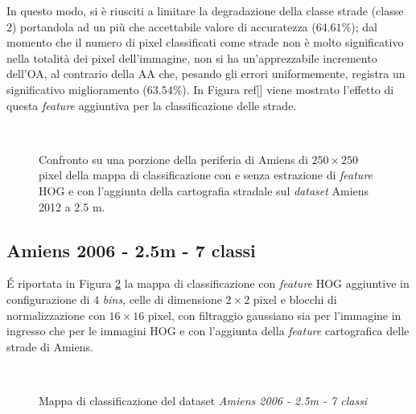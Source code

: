  In questo modo, si è riusciti a limitare la degradazione della classe strade (classe 2) portandola ad un più che accettabile valore di accuratezza ($64.61\%$); dal momento che il numero di pixel classificati come strade non è molto significativo nella totalità dei pixel dell'immagine, non si ha un'apprezzabile incremento dell'OA, al contrario della AA che, pesando gli errori uniformemente, registra un significativo miglioramento ($63.54\%$).
In Figura ref[] viene mostrato l'effetto di questa \emph{feature} aggiuntiva per la classificazione delle strade.
 \begin{figure}[!ht]
\center 
   \hspace{3mm}
      \\
    \caption{Confronto su una porzione della periferia di Amiens di $250\times250$ pixel della mappa di classificazione con e senza estrazione di \emph{feature} HOG e con l'aggiunta della cartografia stradale sul \emph{dataset} Amiens 2012 a $2.5$ m. }
    \label{fig:confrontoAmiens2012_2_5m}
  \end{figure}
  \clearpage
  

\subsection{Amiens 2006 - 2.5m - 7 classi}
\'E riportata in Figura \ref{fig:ClassMap_Amiens2006_2_5m_roadsandhog} la mappa di classificazione con \emph{feature} HOG aggiuntive in configurazione di $4$ \emph{bins}, celle di dimensione $2\times2$ pixel e blocchi di normalizzazione con $16\times16$ pixel, con filtraggio gaussiano sia per l'immagine in ingresso che per le immagini HOG e con l'aggiunta della \emph{feature} cartografica delle strade di Amiens.

\begin{figure}[!ht]
 \center
      \\
     
    \caption{Mappa di classificazione del dataset \emph{Amiens 2006 - 2.5m - 7 classi}}
    \label{fig:ClassMap_Amiens2006_2_5m_roadsandhog}
  \end{figure} 


